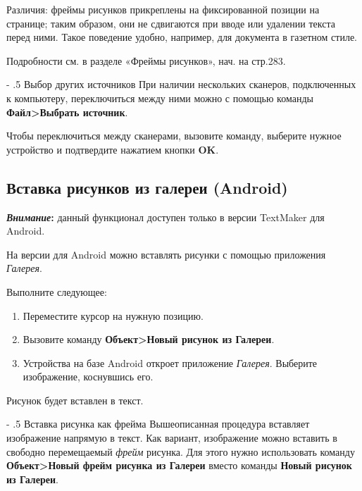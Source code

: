 ﻿\documentclass[a4paper,10pt]{article}
\makeatletter
\renewcommand\paragraph{%
   \@startsection{paragraph}{4}{0mm}%
      {-\baselineskip}%
      {.5\baselineskip}%
      {\normalfont\normalsize\bfseries}}
\makeatother
\begin{document}
Различия: фреймы рисунков прикреплены на фиксированной позиции на странице; таким образом, они не сдвигаются при вводе или удалении текста перед ними. Такое поведение удобно, например, для документа в газетном стиле.

Подробности см. в разделе «Фреймы рисунков», нач. на стр.283.

\paragraph{Выбор других источников}
При наличии нескольких сканеров, подключенных к компьютеру, переключиться между ними можно с помощью команды \textbf{Файл>Выбрать источник}.

Чтобы переключиться между сканерами, вызовите команду, выберите нужное устройство и подтвердите нажатием кнопки \textbf{OK}.

\subsection{Вставка рисунков из галереи (Android)}
\begin{mdframed}[backgroundcolor=blue!10]
\textbf{\textit{Внимание}:} данный функционал доступен только в версии TextMaker для Android.
\end{mdframed}

На версии для Android можно вставлять рисунки с помощью приложения \textit{Галерея}.

Выполните следующее:
\begin{enumerate}
 \item Переместите курсор на нужную позицию.
 \item Вызовите команду \textbf{Объект>Новый рисунок из Галереи}.
 \item Устройства на базе Android откроет приложение \textit{Галерея}. Выберите изображение, коснувшись его.
\end{enumerate}

Рисунок будет вставлен в текст.

\paragraph{Вставка рисунка как фрейма}
Вышеописанная процедура вставляет изображение напрямую в текст. Как вариант, изображение можно вставить в свободно перемещаемый \textit{фрейм} рисунка. Для этого нужно использовать команду \textbf{Объект>Новый фрейм рисунка из Галереи} вместо команды \textbf{Новый рисунок из Галереи}.
\end{document}
